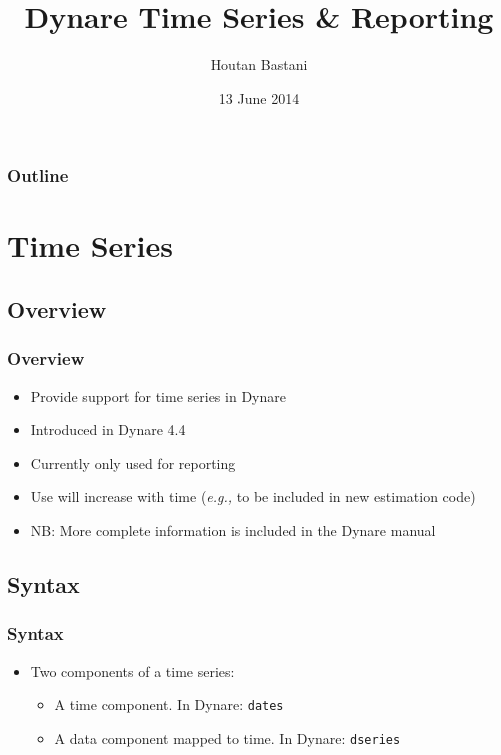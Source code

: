 \documentclass[10pt]{beamer}
\title{Dynare Time Series \& Reporting}
\author{Houtan Bastani}
\institute{CEPREMAP}
\date{13 June 2014}
\begin{document}
\begin{frame}
  \titlepage
\end{frame}

\begin{frame}[t]
  \frametitle{Outline}
  \tableofcontents
\end{frame}

%
%
\section{Time Series}

\subsection{Overview}
\begin{frame}[fragile,t]
  \frametitle{Overview}
  \begin{itemize}
  \item Provide support for time series in Dynare
  \item Introduced in Dynare 4.4
  \item Currently only used for reporting
  \item Use will increase with time (\textit{e.g.,} to be included in new estimation code)
  \item NB: More complete information is included in the Dynare manual
  \end{itemize}
\end{frame}


\subsection{Syntax}
\begin{frame}[fragile,t]
  \frametitle{Syntax}
  \begin{itemize}
  \item Two components of a time series:
    \begin{itemize}
    \item A time component. In Dynare: \texttt{dates}
    \item A data component mapped to time. In Dynare: \texttt{dseries}
    \end{itemize}
  \end{itemize}
\end{frame}
\end{document}
